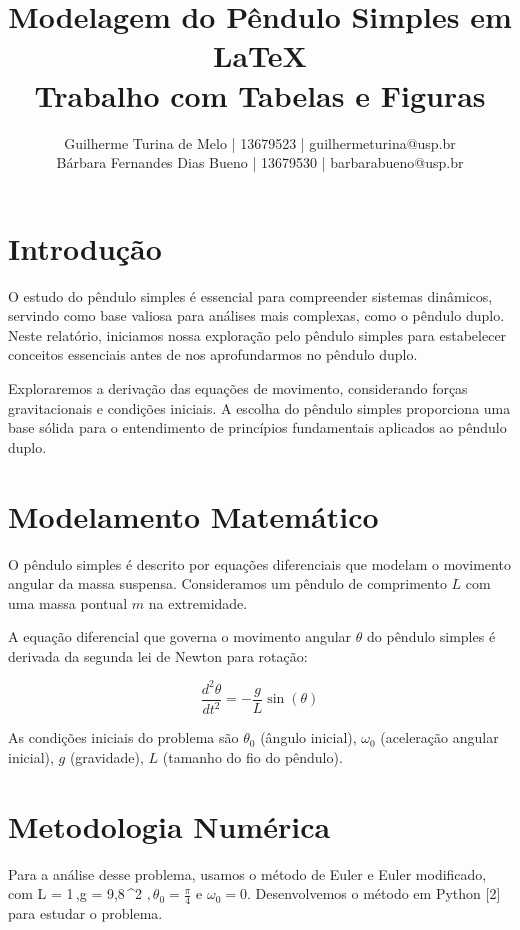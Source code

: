 \documentclass[a4paper, 10pt]{article}
\title{Modelagem do Pêndulo Simples em \LaTeX \\ Trabalho com Tabelas e Figuras}
\author{Guilherme Turina de Melo | 13679523 | guilhermeturina@usp.br \\ Bárbara Fernandes Dias Bueno | 13679530 | barbarabueno@usp.br}
\begin{document}
\maketitle

\section{Introdução}
O estudo do pêndulo simples é essencial para compreender sistemas dinâmicos, servindo como base valiosa para análises mais complexas, como o pêndulo duplo. Neste relatório, iniciamos nossa exploração pelo pêndulo simples para estabelecer conceitos essenciais antes de nos aprofundarmos no pêndulo duplo.

Exploraremos a derivação das equações de movimento, considerando forças gravitacionais e condições iniciais. A escolha do pêndulo simples proporciona uma base sólida para o entendimento de princípios fundamentais aplicados ao pêndulo duplo.

\section{Modelamento Matemático}
O pêndulo simples é descrito por equações diferenciais que modelam o movimento angular da massa suspensa. Consideramos um pêndulo de comprimento \(L\) com uma massa pontual \(m\) na extremidade.

A equação diferencial que governa o movimento angular \(\theta\) do pêndulo simples é derivada da segunda lei de Newton para rotação:

\begin{equation}
    \frac{d^2\theta}{dt^2} = -\frac{g}{L} \sin(\theta)
\end{equation}

As condições iniciais do problema são \(\theta_0\) (ângulo inicial), \(\omega_0\) (aceleração angular inicial), \(g\) (gravidade), \(L\) (tamanho do fio do pêndulo).

\section{Metodologia Numérica}
Para a análise desse problema, usamos o método de Euler e Euler modificado, com L = 1\,,\quad g = 9,8\,^2 
 \(, \theta_0 = \frac{\pi}{4}\) e \(\omega_0 = 0\). Desenvolvemos o método em Python [2] para estudar o problema.
\end{document}
